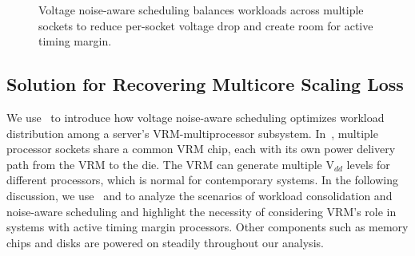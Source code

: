 \begin{figure}[!b]
\centering
\vspace*{-10pt}
\hfill
{}
\caption{Voltage noise-aware scheduling balances workloads across multiple sockets to reduce per-socket voltage drop and create room for active timing margin.}
\label{fig:ll-borrow-idea}
\end{figure}

\subsection{Solution for Recovering Multicore Scaling Loss}
\label{sec:voltage:opt:loadline}

We use~ to introduce how voltage noise-aware scheduling optimizes workload distribution among a server's VRM-multiprocessor subsystem. In~, multiple processor sockets share a common VRM chip, each with its own power delivery path from the VRM to the die. The VRM can generate multiple V$_{dd}$ levels for different processors, which is normal for contemporary systems. In the following discussion, we use~ and  to analyze the scenarios of workload consolidation and noise-aware scheduling and highlight the necessity of considering VRM's role in systems with active timing margin processors. Other components such as memory chips and disks are powered on steadily throughout our analysis.


